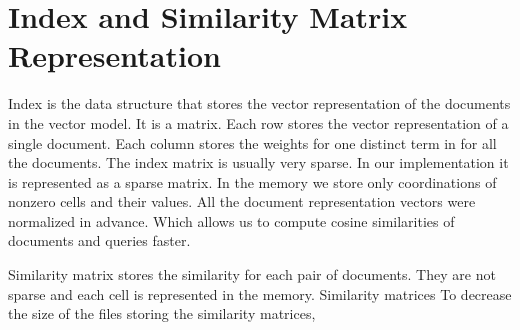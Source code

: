 \section{Index and Similarity Matrix Representation}

Index is the data structure that stores the vector representation of the documents in the vector model. It is a matrix. Each row stores the vector representation of a single document. Each column stores the weights for one distinct term in for all the documents. The index matrix is usually very sparse. In our implementation it is represented as a sparse matrix. In the memory we store only coordinations of nonzero cells and their values. All the document representation vectors were normalized in advance. Which allows us to compute cosine similarities of documents and queries faster.

Similarity matrix stores the similarity for each pair of documents. They are not sparse and each cell is represented in the memory. Similarity matrices To decrease the size of the files storing the similarity matrices, 
